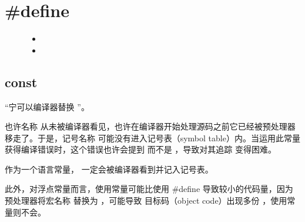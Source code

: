 \documentclass[letterpaper,10pt,english]{sphinxmanual}
\begin{document}
\section{\#define}
\label{\detokenize{cpp/20_define::doc}}\label{\detokenize{cpp/20_define:define}}\begin{description}
\item[{}] \leavevmode\begin{itemize}
\item {} 

\item {} 

\end{itemize}

\end{description}


\subsection{const}
\label{\detokenize{cpp/20_define:const}}
“宁可以编译器替换  ”。

%
\begin{sphinxVerbatim}[commandchars=\\\{\}]

    
\end{sphinxVerbatim}

也许名称  从未被编译器看见，也许在编译器开始处理源码之前它已经被预处理器移走了。于是，记号名称 
可能没有进入记号表（symbol table）内。当运用此常量获得编译错误时，这个错误也许会提到   而不是  ，导致对其追踪
变得困难。

作为一个语言常量，  一定会被编译器看到并记入记号表。

此外，对浮点常量而言，使用常量可能比使用 \#define 导致较小的代码量，因为预处理器将宏名称  替换为   ，可能导致
目标码（object code）出现多份  ，使用常量则不会。
\end{document}

